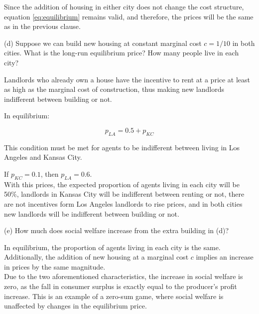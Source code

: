 \begin{myanswerbox}
    Since the addition of housing in either city does not change the cost structure, equation \ref{eq:equilibrium} remains valid, and therefore, the prices will be the same as in the previous clause.
\end{myanswerbox}
\begin{tcolorbox}
    (d) Suppose we can build new housing at constant marginal cost \( c = 1/10 \) in both cities. What is the long-run equilibrium price? How many people live in each city?
\end{tcolorbox}

Landlords who already own a house have the incentive to rent at a price at least as high as the marginal cost of construction, thus making new landlords indifferent between building or not.

In equilibrium:

\begin{equation*}
    p_{LA} = 0.5 + p_{KC}
\end{equation*}

This condition must be met for agents to be indifferent between living in Los Angeles and Kansas City.\\

\begin{myanswerbox}
    If \( p_{KC} = 0.1 \), then \( p_{LA} = 0.6 \).\\
    With this prices, the expected proportion of agents living in each city will be 50\%, landlords in Kansas City will be indifferent between renting or not, there are not incentives form Los Angeles landlords to rise prices, and in both cities new landlords will be indifferent between building or not.
\end{myanswerbox}

\begin{tcolorbox}
    (e) How much does social welfare increase from the extra building in (d)?
\end{tcolorbox}

\begin{myanswerbox}
    In equilibrium, the proportion of agents living in each city is the same. Additionally, the addition of new housing at a marginal cost \( c \) implies an increase in prices by the same magnitude.\\

    Due to the two aforementioned characteristics, the increase in social welfare is zero, as the fall in consumer surplus is exactly equal to the producer's profit increase. This is an example of a zero-sum game, where social welfare is unaffected by changes in the equilibrium price.
\end{myanswerbox}

